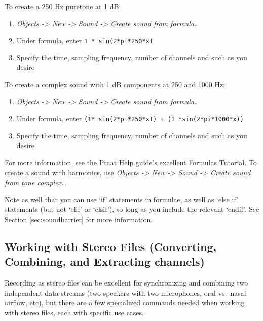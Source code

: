 To create a 250 Hz puretone at 1 dB:

\begin{enumerate}
\def\labelenumi{\arabic{enumi}.}
\tightlist
\item
  \emph{Objects -\textgreater{} New -\textgreater{} Sound
  -\textgreater{} Create sound from formula\ldots{}}
\item
  Under formula, enter \texttt{1 * sin(2*pi*250*x)}
\item
  Specify the time, sampling frequency, number of channels and such as
  you desire
\end{enumerate}

To create a complex sound with 1 dB components at 250 and 1000 Hz:

\begin{enumerate}
\def\labelenumi{\arabic{enumi}.}
\tightlist
\item
  \emph{Objects -\textgreater{} New -\textgreater{} Sound
  -\textgreater{} Create sound from formula\ldots{}}
\item
  Under formula, enter
  \texttt{(1* sin(2*pi*250*x)) + (1 *sin(2*pi*1000*x))}
\item
  Specify the time, sampling frequency, number of channels and such as
  you desire
\end{enumerate}

For more information, see the Praat Help guide's excellent Formulas
Tutorial. To create a sound with harmonics, use \emph{Objects
-\textgreater{} New -\textgreater{} Sound -\textgreater{} Create sound
from tone complex\ldots{}}

Note as well that you can use `if' statements in formulae, as well as
`else if' statements (but not `elif' or `elsif'), so long as you include
the relevant `endif'. See Section \ref{sec:soundbarrier} for more
information.

\hypertarget{working-with-stereo-files-converting-combining-and-extracting-channels}{%
\subsection{Working with Stereo Files (Converting, Combining, and
Extracting
channels)}\label{working-with-stereo-files-converting-combining-and-extracting-channels}}

\label{sec:stereomanip}

Recording as stereo files can be excellent for synchronizing and
combining two independent data-streams (two speakers with two
microphones, oral vs.~nasal airflow, etc), but there are a few
specialized commands needed when working with stereo files, each with
specific use cases.


